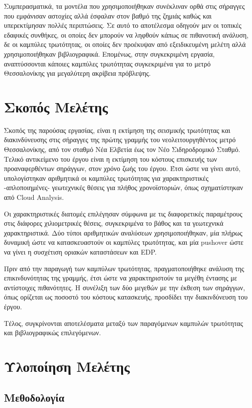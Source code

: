 Συμπερασματικά, τα μοντέλα που χρησιμοποιήθηκαν συνέκλιναν ορθά στις σήραγγες που εμφάνισαν αστοχίες αλλά έσφαλαν στον βαθμό της ζημιάς καθώς και υπερεκτίμησαν πολλές περιπτώσεις. Σε αυτό το αποτέλεσμα οδηγούν μεν οι τοπικές εδαφικές συνθήκες, οι οποίες δεν μπορούν να ληφθούν κάπως σε πιθανοτική ανάλυση, δε οι καμπύλες τρωτότητας, οι οποίες δεν προέκυψαν από εξειδικευμένη μελέτη αλλά χρησιμοποιήθηκαν βιβλιογραφικά. Επομένως, στην συγκεκριμένη εργασία, αναπτύσσονται κάποιες καμπύλες τρωτότητας συγκεκριμένα για το μετρό Θεσσαλονίκης για μεγαλύτερη ακρίβεια πρόβλεψης.


\section{Σκοπός Μελέτης}
Σκοπός της παρούσας εργασίας, είναι η εκτίμηση της σεισμικής τρωτότητας και διακινδύνευσης στις σήραγγες της πρώτης γραμμής του νεολειτουργηθέντος μετρό Θεσσαλονίκης, από τον σταθμό Νέα Ελβετία έως τον Νέο Σιδηροδρομικό Σταθμό. Τελικό αντικείμενο του έργου είναι η εκτίμηση του κόστους επισκευής των προαναφερθέντων σηράγγων, στον χρόνο ζωής του έργου. Έτσι ώστε να γίνει αυτό, υπολογίστηκαν αριθμητικά οι καμπύλες τρωτότητας για χαρακτηριστικές -απλοποιημένες- γεωτεχνικές θέσεις για πλήθος χρονοϊστοριών, όπως σχηματίστηκαν από Cloud Analysis.

Οι χαρακτηριστικές διατομές επιλέγησαν σύμφωνα με τις διαφορετικές παραμέτρους στις διάφορες χιλιομετρικές θέσεις, συγκεκριμένα το βάθος και τα γεωτεχνικά χαρακτηριστικά. Δύο τύποι αριθμητικών αναλύσεων χρησιμοποιήθηκαν, μία πλήρως δυναμική ώστε να κατασκευαστούν οι καμπύλες τρωτότητας, και μία pushover ώστε να γίνει η συσχέτιση οριακών καταστάσεων και EDP.

Πριν από την παραγωγή των καμπύλων τρωτότητας, πραγματοποιήθηκε ανάλυση της επικινδυνότητας της γραμμής, έτσι ώστε να χαρακτηριστούν τα μεγέθη έντασης με αντίστοιχες πιθανότητες. Η συνέλιξη των δύο μεγεθών με την έκθεση των σηράγγων, όπως ορίζεται ως ποσοστό του κόστους κατασκευής, προσδίδει την διακινδύνευση του έργου.

Τέλος, συγκρίνονται αποτελέσματα μεταξύ των παραγόμενων καμπυλών τρωτότητας και βιβλιογραφικώς επιλεγόμενων.

\section{Υλοποίηση Μελέτης}
\subsection{Μεθοδολογία}

